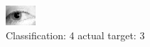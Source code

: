 \begin{figure}[h!]
\begin{center}
\includegraphics[width=0.60\columnwidth]{figures/ID1260_class_4_target_3.png}
\end{center}
\caption{ Classification: 4 actual target: 3}
\label{fig:ID1260_class_4_target_3}
\end{figure}
